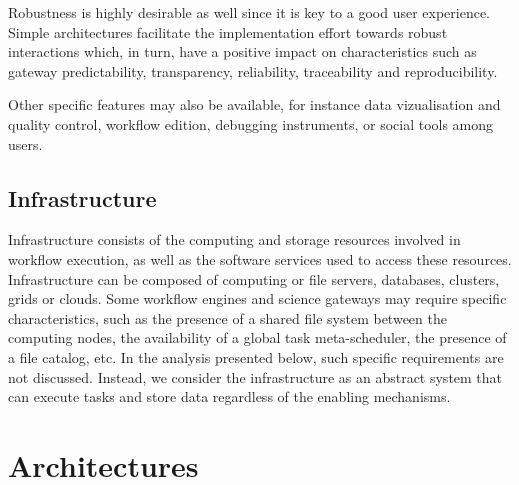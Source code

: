 \documentclass[preprint,3p,twocolumn]{elsarticle}
\newcommand{\note}[2]{\pdfmargincomment[color=yellow,author=#1,open=true]{#2}}
\newcommand{\closednote}[4]{} %
\begin{document}
Robustness is highly desirable as well since it is key to a
good user experience. Simple architectures facilitate the
implementation effort towards robust interactions which, in turn, have
a positive impact on characteristics such as gateway predictability,
transparency, reliability, traceability and
reproducibility. \closednote{Marc-Etienne}{I find that something is
  weak in this last paragraph. Robustness will help with transparency,
  sure, but it seems only a small facet.  Also, the text seem to
  timidly favor architectures with less components/interactions
  without much explanation... Complex systems can be robust, but at
  greater costs...  Here is one: "Architectures showing reduced system
  complexity will greatly facilitate the implementation effort towards
  robust interactions which, in turn, have a positive impact on
  characteristics such as gateway predictability, transparence,
  general reliability and results traceability and reproducibility;
  characteristics that are also key to a good user
  experience."}{Tristan}{Agreed, fixed as
  suggested.}\closednote{Tristan}{Work on the this sentence again.}{Tristan}{done.}

Other specific features may also be available, for instance
data vizualisation and quality control, workflow edition, debugging
instruments, or social tools among users. \closednote{Naj}{I think using etc after such as, for example and e.g. is not correct. --sorry for being pedantic}{Tristan}{You are completely right, this is now fixed.}

\subsection{Infrastructure}

Infrastructure consists of the computing and storage
resources involved in workflow execution, as well as the software
services used to access these resources. Infrastructure can be
composed of computing or file servers, databases, clusters, grids or
clouds. Some workflow engines and science gateways may require specific
characteristics, such as the presence of a shared file system between
the computing nodes, the availability of a global task meta-scheduler,
the presence of a file catalog, etc. In the analysis presented below,
such specific requirements are not discussed. Instead, we consider the
infrastructure as an abstract system that can execute tasks and store
data regardless of the enabling mechanisms.

\section{Architectures}
\label{sec:architectures}
\end{document}
